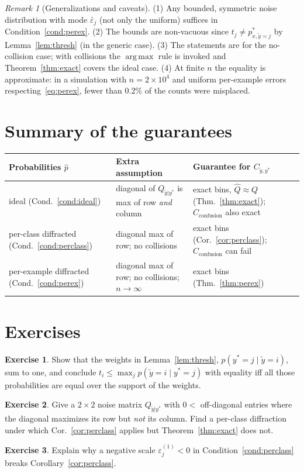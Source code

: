 \documentclass[11pt,a4paper]{report}
\newcommand{\Cyy}{C_{\tilde y,y^*}}
\newcommand{\Cconf}{C_{\text{confusion}}}
\newcommand{\argmax}{\operatorname*{arg\,max}}
\newcommand{\1}{\mathbf 1}
\newcommand{\eps}{\varepsilon}
\theoremstyle{definition}
\newtheorem{exercise}{Exercise}[chapter]
\theoremstyle{plain}
\theoremstyle{remark}
\newtheorem*{remark}{Remark}
\begin{document}
\begin{remark}[Generalizations and caveats]
(1) Any bounded, symmetric noise distribution with mode $\bar\eps_j$ (not only the uniform) suffices in Condition~\ref{cond:perex}. (2) The bounds are non-vacuous since $t_j\ne p^*_{x,\tilde y=j}$ by Lemma~\ref{lem:thresh} (in the generic case). (3) The statements are for the no-collision case; with collisions the $\argmax$ rule is invoked and Theorem~\ref{thm:exact} covers the ideal case. (4) At finite $n$ the equality is approximate: in a simulation with $n=2\times10^4$ and uniform per-example errors respecting~\eqref{eq:perex}, fewer than $0.2\%$ of the counts were misplaced.
\end{remark}

\section{Summary of the guarantees}
\begin{center}
\small
\renewcommand{\arraystretch}{1.3}
\begin{tabular}{@{}p{3.6cm}p{4.2cm}p{4.6cm}@{}}
\toprule
\textbf{Probabilities $\hat p$} & \textbf{Extra assumption} & \textbf{Guarantee for $\Cyy$}\\
\midrule
ideal (Cond.~\ref{cond:ideal}) & diagonal of $Q_{\tilde y|y^*}$ is max of row \emph{and} column & exact bins, $\hat Q\approx Q$ (Thm.~\ref{thm:exact}); $\Cconf$ also exact\\
per-class diffracted (Cond.~\ref{cond:perclass}) & diagonal max of row; no collisions & exact bins (Cor.~\ref{cor:perclass}); $\Cconf$ can fail\\
per-example diffracted (Cond.~\ref{cond:perex}) & diagonal max of row; no collisions; $n\to\infty$ & exact bins (Thm.~\ref{thm:perex})\\
\bottomrule
\end{tabular}
\end{center}

\section*{Exercises}
\begin{exercise}
Show that the weights in Lemma~\ref{lem:thresh}, $p(y^*=j\mid\tilde y=i)$, sum to one, and conclude $t_i\le\max_j p(\tilde y=i\mid y^*=j)$ with equality iff all those probabilities are equal over the support of the weights.
\end{exercise}
\begin{exercise}
Give a $2\times2$ noise matrix $Q_{\tilde y|y^*}$ with $0<$ off-diagonal entries where the diagonal maximizes its row but \emph{not} its column. Find a per-class diffraction under which Cor.~\ref{cor:perclass} applies but Theorem~\ref{thm:exact} does not.
\end{exercise}
\begin{exercise}
Explain why a negative scale $\eps^{(1)}_j<0$ in Condition~\ref{cond:perclass} breaks Corollary~\ref{cor:perclass}.
\end{exercise}
\end{document}
